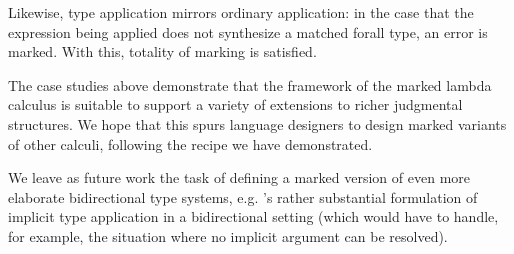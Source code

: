 Likewise, type application mirrors ordinary application: in the case that the expression being applied does not synthesize a matched forall type, an error is marked. With this, totality of marking is satisfied.
%
\begin{mathpar}

\end{mathpar}

The case studies above demonstrate that the framework of the marked lambda calculus is suitable to support a variety of extensions to richer judgmental structures.
We hope that this spurs language designers to design marked variants of other calculi, following the recipe we have demonstrated.

We leave as future work the task of defining a marked version of even more elaborate bidirectional type systems, e.g. \citet{dunfield2013complete}'s rather substantial formulation of implicit type application in a bidirectional setting (which would have to handle, for example, the situation where no implicit argument can be resolved).

